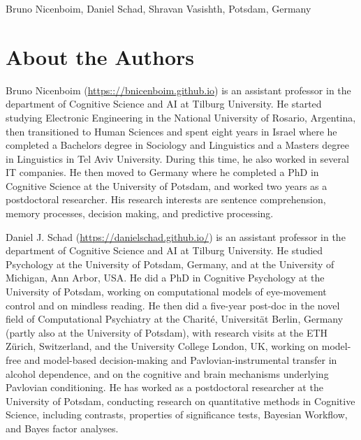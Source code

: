 \documentclass[12pt,]{krantz}
\theoremstyle{definition}
\theoremstyle{definition}
\theoremstyle{definition}
\theoremstyle{remark}
\begin{document}
\begin{flushright} Bruno Nicenboim, Daniel Schad, Shravan
Vasishth, Potsdam, Germany \end{flushright}

\chapter*{About the Authors}\label{about-the-authors}


Bruno Nicenboim (\url{https:://bnicenboim.github.io}) is an assistant
professor in the department of Cognitive Science and AI at Tilburg
University. He started studying Electronic Engineering in the National
University of Rosario, Argentina, then transitioned to Human Sciences
and spent eight years in Israel where he completed a Bachelors degree in
Sociology and Linguistics and a Masters degree in Linguistics in Tel
Aviv University. During this time, he also worked in several IT
companies. He then moved to Germany where he completed a PhD in
Cognitive Science at the University of Potsdam, and worked two years as
a postdoctoral researcher. His research interests are sentence
comprehension, memory processes, decision making, and predictive
processing.

Daniel J. Schad (\url{https://danielschad.github.io/}) is an assistant
professor in the department of Cognitive Science and AI at Tilburg
University. He studied Psychology at the University of Potsdam, Germany,
and at the University of Michigan, Ann Arbor, USA. He did a PhD in
Cognitive Psychology at the University of Potsdam, working on
computational models of eye-movement control and on mindless reading. He
then did a five-year post-doc in the novel field of Computational
Psychiatry at the Charité, Universität Berlin, Germany (partly also at
the University of Potsdam), with research visits at the ETH Zürich,
Switzerland, and the University College London, UK, working on
model-free and model-based decision-making and Pavlovian-instrumental
transfer in alcohol dependence, and on the cognitive and brain
mechanisms underlying Pavlovian conditioning. He has worked as a
postdoctoral researcher at the University of Potsdam, conducting
research on quantitative methods in Cognitive Science, including
contrasts, properties of significance tests, Bayesian Workflow, and
Bayes factor analyses.
\end{document}

